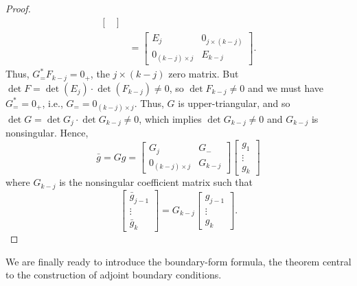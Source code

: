 \documentclass[12pt, oneside, a4paper]{article}
\begin{document}
\begin{proof}
\begin{align*}
\begin{bmatrix}
    \end{bmatrix}\\
    &= \begin{bmatrix}
        E_j & 0_{j\times (k-j)}\\
        0_{(k-j)\times j} & E_{k-j}
    \end{bmatrix}.
\end{align*}
Thus, $G^*_=F_{k-j}=0_+$, the $j\times (k-j)$ zero matrix. But $\det F = \det(E_j)\cdot \det(F_{k-j})\neq 0$, so $\det F_{k-j}\neq 0$ and we must have $G^*_==0_+$, i.e., $G_= =0_{(k-j)\times j}$. Thus, $G$ is upper-triangular, and so $\det G = \det G_j \cdot \det G_{k-j}\neq 0$, which implies $\det G_{k-j}\neq 0$ and $G_{k-j}$ is nonsingular. Hence,
\[\bar{g} = Gg = \begin{bmatrix}G_j & G_-\\
0_{(k-j)\times j} & G_{k-j}\end{bmatrix} \begin{bmatrix}
g_1\\
\vdots\\
g_k
\end{bmatrix}\]
where $G_{k-j}$ is the nonsingular coefficient matrix such that
\[\begin{bmatrix}
    \bar{g}_{j-1}\\
    \vdots\\
    \bar{g}_{k}
\end{bmatrix} = G_{k-j}\begin{bmatrix}
    g_{j-1}\\
    \vdots\\
    g_{k}
\end{bmatrix}.\]
\end{proof}

We are finally ready to introduce the boundary-form formula, the theorem central to the construction of adjoint boundary conditions.
\end{document}
